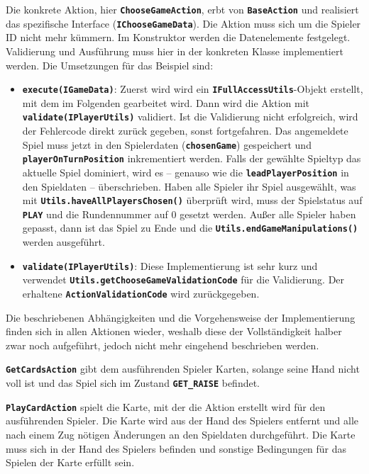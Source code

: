 \documentclass[
							a4paper, 
							11pt, 
							openany, 
							liststotoc,
							parskip=half, 
   							headings=normal
						]{scrreprt}
\begin{document}
{Die konkrete Aktion, hier \textbf{\texttt{ChooseGameAction}}, erbt von \textbf{\texttt{BaseAction}} und realisiert das spezifische Interface (\textbf{\texttt{IChooseGameData}}). Die Aktion muss sich um die Spieler ID nicht mehr kümmern. Im Konstruktor werden die Datenelemente festgelegt. Validierung und Ausführung muss hier in der konkreten Klasse implementiert werden. Die Umsetzungen für das Beispiel sind:
\begin{itemize}
	\item \textbf{\texttt{execute(IGameData)}}:\newline
 Zuerst wird wird ein \textbf{\texttt{IFullAccessUtils}}-Objekt erstellt, mit dem im Folgenden gearbeitet wird.
Dann wird die Aktion mit \textbf{\texttt{validate(IPlayerUtils)}} validiert. Ist die Validierung nicht erfolgreich, wird der Fehlercode direkt zurück gegeben, sonst fortgefahren.
Das angemeldete Spiel muss jetzt in den Spielerdaten (\textbf{\texttt{chosenGame}}) gespeichert und \textbf{\texttt{playerOnTurnPosition}} inkrementiert werden. Falls der gewählte Spieltyp das aktuelle Spiel dominiert, wird es -- genauso wie die \textbf{\texttt{le\-ad\-Pla\-yer\-Po\-si\-ti\-on}} in den Spieldaten -- überschrieben. \newline
Haben alle Spieler ihr Spiel ausgewählt, was mit \textbf{\texttt{Utils.haveAllPlayersChosen()}} überprüft wird, muss der Spielstatus auf \textbf{\texttt{PLAY}} und die Rundennummer auf 0 gesetzt werden.
Außer alle Spieler haben gepasst, dann ist das Spiel zu Ende und die \textbf{\texttt{Utils.endGameManipulations()}} werden ausgeführt.
	\item \textbf{\texttt{validate(IPlayerUtils)}}:\newline
Diese Implementierung ist sehr kurz und verwendet \textbf{\texttt{Utils.get\-Cho\-ose\-Ga\-me\-Va\-li\-da\-ti\-on\-Co\-de}} für die Validierung. Der erhaltene \textbf{\texttt{ActionValidationCode}} wird zurückgegeben.
\end{itemize}\bigskip

Die beschriebenen Abhängigkeiten und die Vorgehensweise der Implementierung finden sich in allen Aktionen wieder, weshalb diese der Vollständigkeit halber zwar noch aufgeführt, jedoch nicht mehr eingehend beschrieben werden.

\textbf{\texttt{GetCardsAction}} gibt dem ausführenden Spieler Karten, solange seine Hand nicht voll ist und das Spiel sich im Zustand \textbf{\texttt{GET{\_}RAISE}} befindet.

\textbf{\texttt{PlayCardAction}} spielt die Karte, mit der die Aktion erstellt wird für den ausführenden Spieler. Die Karte wird aus der Hand des Spielers entfernt und alle nach einem Zug nötigen Änderungen an den Spieldaten durchgeführt. Die Karte muss sich in der Hand des Spielers befinden und sonstige Bedingungen für das Spielen der Karte erfüllt sein.

}
\end{document}
